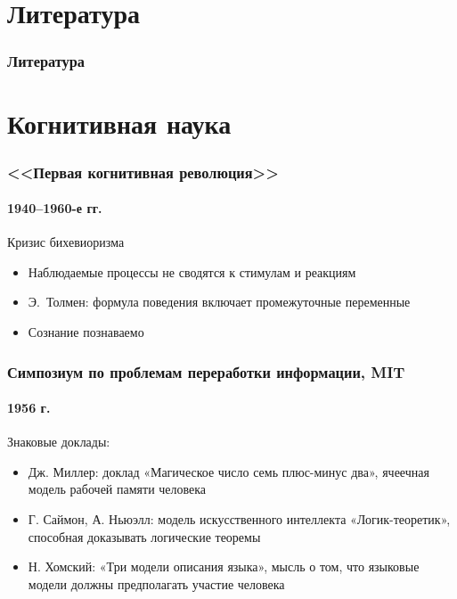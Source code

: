% 

\frame{\titlepage}

\section{Литература}
\frame{\tableofcontents[currentsection]}

\begin{frame}
  \frametitle{Литература}
  \nocite{*}
  \printbibliography
\end{frame}

\section{Когнитивная наука}
\frame{\tableofcontents[currentsection]}

\begin{frame}
  \frametitle{<<Первая когнитивная революция>>}
  \framesubtitle{1940--1960-е гг.}

  \begin{block}{Кризис бихевиоризма}
    \begin{itemize}
      \item Наблюдаемые процессы не сводятся к стимулам и реакциям
      \item Э.~Толмен: формула поведения включает промежуточные переменные
      \item Сознание познаваемо
    \end{itemize}
  \end{block}
\end{frame}

\begin{frame}
  \frametitle{Симпозиум по проблемам переработки информации, MIT}
  \framesubtitle{1956 г.}

  Знаковые доклады: \begin{itemize}
    \item Дж. Миллер: доклад «Магическое число семь плюс-минус два», ячеечная модель рабочей памяти человека
    \item Г. Саймон, А. Ньюэлл: модель искусственного интеллекта «Логик-теоретик», способная доказывать логические теоремы
    \item Н. Хомский: «Три модели описания языка», мысль о том, что языковые модели должны предполагать участие человека
  \end{itemize}
\end{frame}

